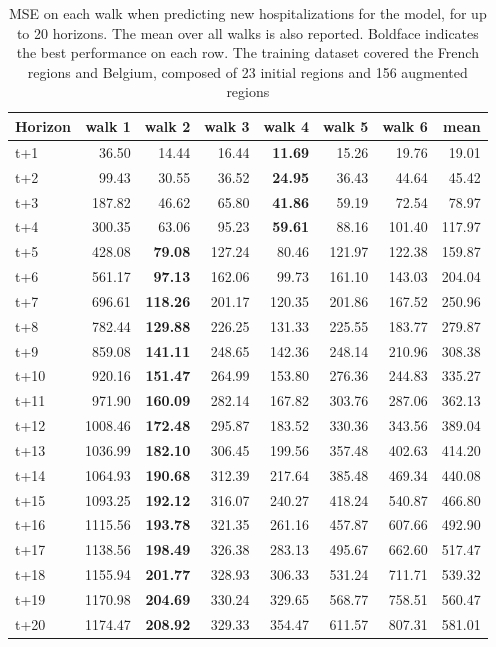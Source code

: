 \begin{table}[H]
\centering
\caption{MSE on each walk when predicting new hospitalizations for the model, for up to 20 horizons. The mean over all walks is also reported. Boldface indicates the best performance on each row. The training dataset covered the French regions and Belgium, composed of 23 initial regions and 156 augmented regions }
\label{tab:MSE_walk_baseline}
\begin{tabular}{lrrrrrrr}
\toprule
Horizon &  walk 1 &  walk 2 &  walk 3 &  walk 4 &  walk 5 &  walk 6 &   mean \\
\midrule
t+1  & 36.50  & 14.44  & 16.44  & \textbf{11.69}  & 15.26  & 19.76  & 19.01  \\
t+2  & 99.43  & 30.55  & 36.52  & \textbf{24.95}  & 36.43  & 44.64  & 45.42  \\
t+3  & 187.82  & 46.62  & 65.80  & \textbf{41.86}  & 59.19  & 72.54  & 78.97  \\
t+4  & 300.35  & 63.06  & 95.23  & \textbf{59.61}  & 88.16  & 101.40  & 117.97  \\
t+5  & 428.08  & \textbf{79.08}  & 127.24  & 80.46  & 121.97  & 122.38  & 159.87  \\
t+6  & 561.17  & \textbf{97.13}  & 162.06  & 99.73  & 161.10  & 143.03  & 204.04  \\
t+7  & 696.61  & \textbf{118.26}  & 201.17  & 120.35  & 201.86  & 167.52  & 250.96  \\
t+8  & 782.44  & \textbf{129.88}  & 226.25  & 131.33  & 225.55  & 183.77  & 279.87  \\
t+9  & 859.08  & \textbf{141.11}  & 248.65  & 142.36  & 248.14  & 210.96  & 308.38  \\
t+10  & 920.16  & \textbf{151.47}  & 264.99  & 153.80  & 276.36  & 244.83  & 335.27  \\
t+11  & 971.90  & \textbf{160.09}  & 282.14  & 167.82  & 303.76  & 287.06  & 362.13  \\
t+12  & 1008.46  & \textbf{172.48}  & 295.87  & 183.52  & 330.36  & 343.56  & 389.04  \\
t+13  & 1036.99  & \textbf{182.10}  & 306.45  & 199.56  & 357.48  & 402.63  & 414.20  \\
t+14  & 1064.93  & \textbf{190.68}  & 312.39  & 217.64  & 385.48  & 469.34  & 440.08  \\
t+15  & 1093.25  & \textbf{192.12}  & 316.07  & 240.27  & 418.24  & 540.87  & 466.80  \\
t+16  & 1115.56  & \textbf{193.78}  & 321.35  & 261.16  & 457.87  & 607.66  & 492.90  \\
t+17  & 1138.56  & \textbf{198.49}  & 326.38  & 283.13  & 495.67  & 662.60  & 517.47  \\
t+18  & 1155.94  & \textbf{201.77}  & 328.93  & 306.33  & 531.24  & 711.71  & 539.32  \\
t+19  & 1170.98  & \textbf{204.69}  & 330.24  & 329.65  & 568.77  & 758.51  & 560.47  \\
t+20  & 1174.47  & \textbf{208.92}  & 329.33  & 354.47  & 611.57  & 807.31  & 581.01  \\

\bottomrule
\end{tabular}
\end{table}
